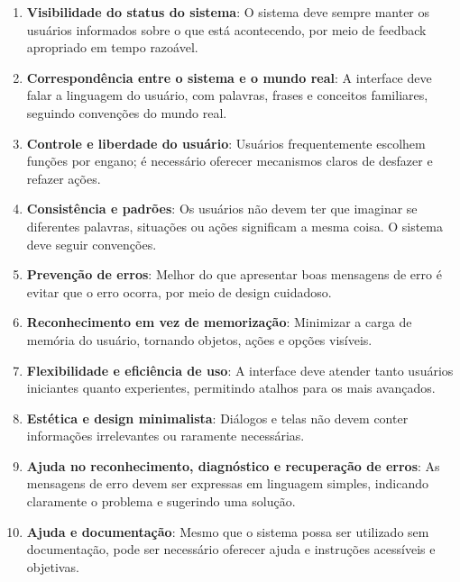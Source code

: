 \begin{enumerate}
    \item \textbf{Visibilidade do status do sistema}: O sistema deve sempre manter os usuários informados sobre o que está acontecendo, por meio de feedback apropriado em tempo razoável.
    
    \item \textbf{Correspondência entre o sistema e o mundo real}: A interface deve falar a linguagem do usuário, com palavras, frases e conceitos familiares, seguindo convenções do mundo real.
    
    \item \textbf{Controle e liberdade do usuário}: Usuários frequentemente escolhem funções por engano; é necessário oferecer mecanismos claros de desfazer e refazer ações.
    
    \item \textbf{Consistência e padrões}: Os usuários não devem ter que imaginar se diferentes palavras, situações ou ações significam a mesma coisa. O sistema deve seguir convenções.
    
    \item \textbf{Prevenção de erros}: Melhor do que apresentar boas mensagens de erro é evitar que o erro ocorra, por meio de design cuidadoso.
    
    \item \textbf{Reconhecimento em vez de memorização}: Minimizar a carga de memória do usuário, tornando objetos, ações e opções visíveis.
    
    \item \textbf{Flexibilidade e eficiência de uso}: A interface deve atender tanto usuários iniciantes quanto experientes, permitindo atalhos para os mais avançados.
    
    \item \textbf{Estética e design minimalista}: Diálogos e telas não devem conter informações irrelevantes ou raramente necessárias.
    
    \item \textbf{Ajuda no reconhecimento, diagnóstico e recuperação de erros}: As mensagens de erro devem ser expressas em linguagem simples, indicando claramente o problema e sugerindo uma solução.
    
    \item \textbf{Ajuda e documentação}: Mesmo que o sistema possa ser utilizado sem documentação, pode ser necessário oferecer ajuda e instruções acessíveis e objetivas.
\end{enumerate}

